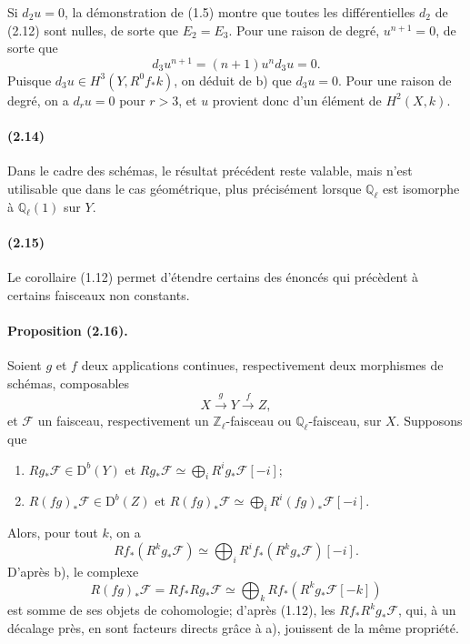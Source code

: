\documentclass[10pt]{article}
\newcommand{\og}{\guillemotleft}
\newcommand{\fg}{\guillemotright}
\providecommand{\Ql}{\mathbb Q_\ell}
\providecommand{\Zl}{\mathbb Z_\ell}
\providecommand{\og}{\guillemotleft}
\providecommand{\fg}{\guillemotright}
\providecommand{\D}{\mathrm D}
\begin{document}
Si $d_2u=0$, la démonstration de (1.5) montre que toutes les différentielles $d_2$ de (2.12) sont nulles, de sorte que $E_2=E_3$. Pour une raison de degré, $u^{n+1}=0$, de sorte que
\[
d_3u^{n+1}=(n+1)u^n d_3u=0.
\]
Puisque $d_3u\in H^3(Y,R^0f_*k)$, on déduit de b) que $d_3u=0$. Pour une raison de degré, on a $d_ru=0$ pour $r>3$, et $u$ provient donc d'un élément de $H^2(X,k)$.

\paragraph{(2.14)} Dans le cadre des schémas, le résultat précédent reste valable, mais n'est utilisable que dans le cas \og géométrique\fg, plus précisément lorsque $\Ql$ est isomorphe à $\Ql(1)$ sur $Y$.

\paragraph{(2.15)} Le corollaire (1.12) permet d'étendre certains des énoncés qui précèdent à certains faisceaux non constants.

\paragraph{Proposition (2.16).} Soient $g$ et $f$ deux applications continues, respectivement deux morphismes de schémas, composables
\[
X\xrightarrow{g}Y\xrightarrow{f}Z,
\]
et $\mathcal F$ un faisceau, respectivement un $\Zl$-faisceau ou $\Ql$-faisceau, sur $X$. Supposons que
\begin{enumerate}[label=\alph*)]
\item $Rg_*\mathcal F\in\D^b(Y)$ et $Rg_*\mathcal F\simeq\bigoplus_iR^ig_*\mathcal F[-i]$;
\item $R(fg)_*\mathcal F\in\D^b(Z)$ et $R(fg)_*\mathcal F\simeq\bigoplus_iR^i(fg)_*\mathcal F[-i]$.
\end{enumerate}
Alors, pour tout $k$, on a
\[
Rf_*(R^kg_*\mathcal F)\simeq\bigoplus_i R^if_*(R^kg_*\mathcal F)[-i].
\]
D'après b), le complexe
\[
R(fg)_*\mathcal F=Rf_*Rg_*\mathcal F\simeq
\bigoplus_kRf_*(R^kg_*\mathcal F[-k])
\]
est somme de ses objets de cohomologie; d'après (1.12), les $Rf_*R^kg_*\mathcal F$, qui, à un décalage près, en sont facteurs directs grâce à a), jouissent de la même propriété.
\end{document}
